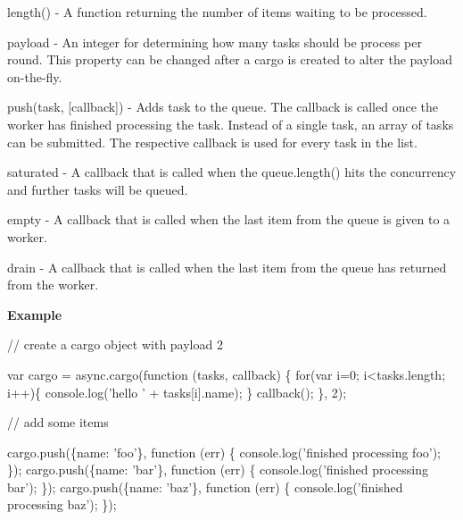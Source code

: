 \begin{DoxyItemize}
\item {\ttfamily length()} -\/ A function returning the number of items waiting to be processed.
\item {\ttfamily payload} -\/ An {\ttfamily integer} for determining how many tasks should be process per round. This property can be changed after a {\ttfamily cargo} is created to alter the payload on-\/the-\/fly.
\item {\ttfamily push(task, \mbox{[}callback\mbox{]})} -\/ Adds {\ttfamily task} to the {\ttfamily queue}. The callback is called once the {\ttfamily worker} has finished processing the task. Instead of a single task, an array of {\ttfamily tasks} can be submitted. The respective callback is used for every task in the list.
\item {\ttfamily saturated} -\/ A callback that is called when the {\ttfamily queue.\+length()} hits the concurrency and further tasks will be queued.
\item {\ttfamily empty} -\/ A callback that is called when the last item from the {\ttfamily queue} is given to a {\ttfamily worker}.
\item {\ttfamily drain} -\/ A callback that is called when the last item from the {\ttfamily queue} has returned from the {\ttfamily worker}.
\end{DoxyItemize}

{\bfseries Example}


\begin{DoxyCode}
\textcolor{comment}{// create a cargo object with payload 2}

var cargo = async.cargo(\textcolor{keyword}{function} (tasks, callback) \{
    \textcolor{keywordflow}{for}(var i=0; i<tasks.length; i++)\{
      console.log(\textcolor{stringliteral}{'hello '} + tasks[i].name);
    \}
    callback();
\}, 2);


\textcolor{comment}{// add some items}

cargo.push(\{name: \textcolor{stringliteral}{'foo'}\}, \textcolor{keyword}{function} (err) \{
    console.log(\textcolor{stringliteral}{'finished processing foo'});
\});
cargo.push(\{name: \textcolor{stringliteral}{'bar'}\}, \textcolor{keyword}{function} (err) \{
    console.log(\textcolor{stringliteral}{'finished processing bar'});
\});
cargo.push(\{name: \textcolor{stringliteral}{'baz'}\}, \textcolor{keyword}{function} (err) \{
    console.log(\textcolor{stringliteral}{'finished processing baz'});
\});
\end{DoxyCode}
 



